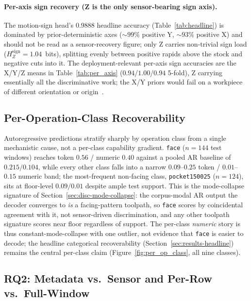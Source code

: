 \documentclass[sensors,article,submit,moreauthors,pdftex]{Definitions/mdpi}
\begin{document}
\paragraph{Per-axis sign recovery (Z is the only sensor-bearing sign axis).} The motion-sign head's $0.9888$ headline accuracy (Table~\ref{tab:headline}) is dominated by prior-deterministic axes ($\sim\!99\%$ positive Y, $\sim\!93\%$ positive X) and should not be read as a sensor-recovery figure; only Z carries non-trivial sign load ($H_{Z}^{\text{sign}}\!=\!1.04$~bits), splitting evenly between positive rapids above the stock and negative cuts into it. The deployment-relevant per-axis sign accuracies are the X/Y/Z means in Table~\ref{tab:per_axis} ($0.94$/$1.00$/$0.94$ 5-fold), Z carrying essentially all the discriminative work; the X/Y priors would fail on a workpiece of different orientation or origin~\cite{paperB_entropy}.

\subsection{Per-Operation-Class Recoverability}
\label{sec:per-op-class}

Autoregressive predictions stratify sharply by operation class from a single mechanistic cause, not a per-class capability gradient. \texttt{face} ($n=144$ test windows) reaches token $0.56$ / numeric $0.40$ against a pooled AR baseline of $0.215 / 0.104$, while every other class falls into a narrow $0.09$--$0.25$ token / $0.01$--$0.15$ numeric band; the most-frequent non-facing class, \texttt{pocket150025} ($n=124$), sits at floor-level $0.09 / 0.01$ despite ample test support. This is the mode-collapse signature of Section~\ref{sec:disc-mode-collapse}: the corpus-modal AR output the decoder converges to \emph{is} a facing-pattern toolpath, so \texttt{face} scores by coincidental agreement with it, not sensor-driven discrimination, and any other toolpath signature scores near floor regardless of support. The per-class \emph{numeric} story is thus constant-mode-collapse with one outlier, not evidence that \texttt{face} is easier to decode; the headline categorical recoverability (Section~\ref{sec:results-headline}) remains the central per-class claim (Figure~\ref{fig:per_op_class}, all nine classes).
\subsection{RQ2: Metadata vs.\ Sensor and Per-Row vs.\ Full-Window}
\label{sec:results-rq2}
\end{document}

